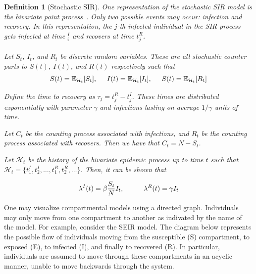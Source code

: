 \documentclass[12pt]{article}
\newtheorem{definition}{Definition}
\begin{document}
\vspace{3mm}

\begin{definition}[Stochastic SIR]\label{stochastic-SIR}
One representation of the stochastic SIR model is the bivariate point process~\cite{Rizoiu2018}. Only two possible events may occur: infection and recovery. In this representation, the $j$-th infected individual in the SIR process gets infected at time $_i^I$ and recovers at time $t_j^R$. 
\\
\\
Let $S_t$, $I_t$, and $R_t$ be discrete random variables. These are all stochastic counter parts to $S(t)$, $I(t)$, and $R(t)$ respectively such that
\[
S(t) = \mathbb{E}_{\mathcal{H}_t} [ S_t ] , \hspace{5mm}
I(t) = \mathbb{E}_{\mathcal{H}_t} [ I_t ] , \hspace{5mm}
S(t) = \mathbb{E}_{\mathcal{H}_t} [ R_t ] 
\]


Define the time to recovery as $\tau_j = t_j^R - t_j^I$. These times are distributed exponentially with parameter $\gamma$ and infections lasting on average $1/\gamma$ units of time. 

Let $C_t$ be the counting process associated with infections, and $R_t$ be the counting process associated with recovers. Then we have that $C_t = N - S_t$. 

Let $\mathcal{H}_t$ be the history of the bivariate epidemic process up to time $t$ such that $\mathcal{H}_t = \{t_1^I, t_2^I, \ldots, t_1^R, t_2^R, \ldots \}$. Then, it can be shown that

\[
\lambda^I(t) = \beta \frac{S_t}{N} I_t, \hspace{10mm}
\lambda^R(t) = \gamma I_t
\]  
\end{definition}



One may visualize compartmental models using a directed graph. Individuals may only move from one compartment to another as indivated by the name of the model. For example, consider the SEIR model. The diagram below represents the possible flow of individuals moving from the susceptible (S) compartment, to exposed (E), to infected (I), and finally to recovered (R). In particular, individuals are assumed to move through these compartments in an acyclic manner, unable to move backwards through the system. 

\begin{center}
  \end{center}
\end{document}
